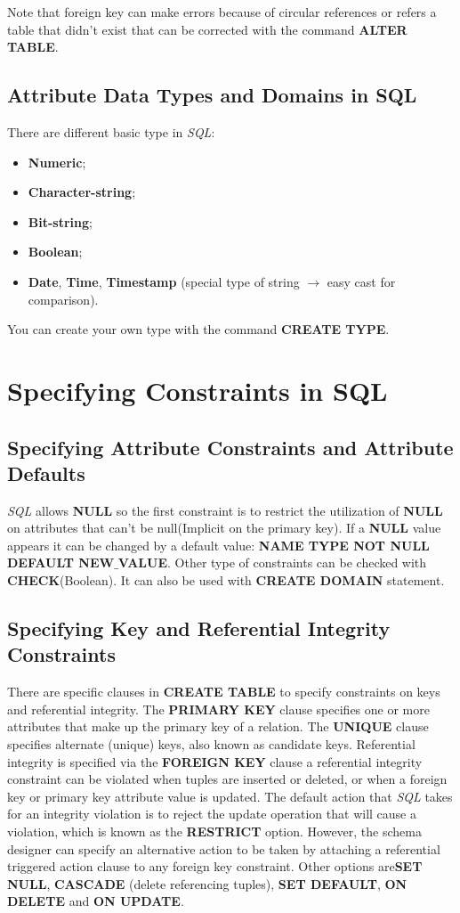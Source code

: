Note that foreign key can make errors because of circular references or refers a table that didn't exist that can be corrected with the command \textbf{ALTER TABLE}.
\subsection{Attribute Data Types and Domains in SQL}
There are different basic type in \textit{SQL}:
\begin{itemize}
    \item \textbf{Numeric};
    \item \textbf{Character-string};
    \item \textbf{Bit-string};
    \item \textbf{Boolean};
    \item \textbf{Date}, \textbf{Time}, \textbf{Timestamp} (special type of string $\rightarrow$ easy cast for comparison).
\end{itemize}
 You can create your own type with the command \textbf{CREATE TYPE}.
\section{Specifying Constraints in SQL}
\subsection{Specifying Attribute Constraints and Attribute Defaults}
\textit{SQL} allows \textbf{NULL} so the first constraint is to restrict the utilization of \textbf{NULL} on attributes that can't be null(Implicit on the primary key). If a \textbf{NULL} value appears it can be changed by a default value: \textbf{NAME TYPE NOT NULL DEFAULT NEW$\_$VALUE}. Other type of constraints can be checked with \textbf{CHECK}(Boolean). It can also be used with \textbf{CREATE DOMAIN} statement. 
\subsection{Specifying Key and Referential Integrity Constraints}
There are specific clauses in \textbf{CREATE TABLE} to specify constraints on keys and referential integrity. The \textbf{PRIMARY KEY} clause specifies one or more attributes that make up the primary key of a relation. The \textbf{UNIQUE} clause specifies alternate (unique) keys, also known as candidate keys. Referential integrity is specified via the \textbf{FOREIGN KEY} clause a referential integrity constraint can be violated when tuples are inserted or deleted, or when a foreign key or primary key attribute value is updated. The default action that \textit{SQL} takes for an integrity violation is to reject the update operation that will cause a violation, which is known as the \textbf{RESTRICT} option. However, the schema designer can specify an alternative action to be taken by attaching a referential triggered action clause to any foreign key constraint. Other options are\textbf{SET NULL}, \textbf{CASCADE} (delete referencing tuples), \textbf{SET DEFAULT}, \textbf{ON DELETE} and \textbf{ON UPDATE}.
